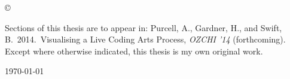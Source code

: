 
\vspace*{14cm}
\begin{center}
  \makeatletter
  \copyright\ \@author
  \makeatother
\end{center}
\noindent
\begin{center}
\end{center}
\noindent

\newpage

\vspace*{7cm}


\begin{center}
	Sections of this thesis are to appear in: Purcell, A., Gardner, H., and Swift, B.~2014.~Visualising a Live Coding Arts Process, \textit{OZCHI '14} (forthcoming).\\
	\vspace*{10mm}
	Except where otherwise indicated, this thesis is my own original work.
\end{center}

\vspace*{4cm}

\hspace{8cm}\makeatletter\@author\makeatother\par
\hspace{8cm}\today
